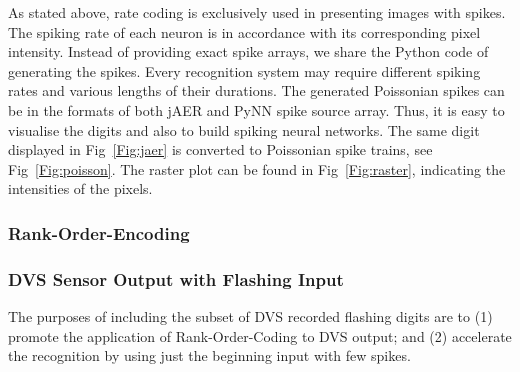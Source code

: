 	As stated above, rate coding is exclusively used in presenting images with spikes.
	The spiking rate of each neuron is in accordance with its corresponding pixel intensity.
	Instead of providing exact spike arrays, we share the Python code of generating the spikes.
	Every recognition system may require different spiking rates and various lengths of their durations.
	The generated Poissonian spikes can be in the formats of both jAER and PyNN spike source array.
	Thus, it is easy to visualise the digits and also to build spiking neural networks.
	The same digit displayed in Fig~\ref{Fig:jaer} is converted to Poissonian spike trains, see Fig~\ref{Fig:poisson}.
	The raster plot can be found in Fig~\ref{Fig:raster}, indicating the intensities of the pixels.
	
%	
	
	\subsubsection{Rank-Order-Encoding}
  
	\subsubsection{DVS Sensor Output with Flashing Input}
	The purposes of including the subset of DVS recorded flashing digits are to (1) promote the application of Rank-Order-Coding to DVS output; and (2) accelerate the recognition by using just the beginning input with few spikes.
	
